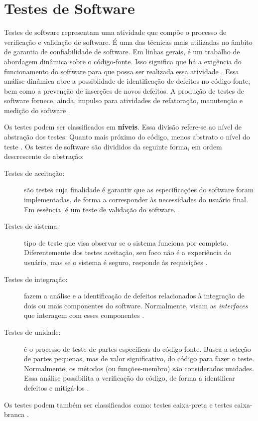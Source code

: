 \section{Testes de Software}
Testes de software representam uma atividade que compõe o processo de verificação e validação de software. É uma das técnicas mais utilizadas no âmbito de garantia de confiabilidade de software. Em linhas gerais, é um trabalho de abordagem dinâmica sobre o código-fonte. Isso significa que há a exigência do funcionamento do software para que possa ser realizada essa atividade \cite{barbosaEtAl2009}. Essa análise dinâmica abre a possiblidade de identificação de defeitos no código-fonte, bem como a prevenção de inserções de novos defeitos. A produção de testes de software fornece, ainda, impulso para atividades de refatoração, manutenção e medição do software \cite{barbosaEtAl2009}.
\par
\indent Os testes podem ser classificados em \textbf{níveis}. Essa divisão refere-se ao nível de abstração dos testes. Quanto mais próximo do código, menos abstrato o nível do teste \cite{sommerville2007}. Os testes de software são divididos da seguinte forma, em ordem descrescente de abstração:
\begin{description}
\item[Testes de aceitação:] são testes cuja finalidade é garantir que as especificações do software foram implementadas, de forma a corresponder às necessidades do usuário final. Em essência, é um teste de validação do software. \cite{sommerville2007}.
\item[Testes de sistema:] tipo de teste que visa observar se o sistema funciona por completo. Diferentemente dos testes aceitação, seu foco não é a experiência do usuário, mas se o sistema é seguro, responde às requisições \cite{sommerville2007}.
\item[Testes de integração:] fazem a análise e a identificação de defeitos relacionados à integração de dois ou mais componentes do software. Normalmente, visam as \textit{interfaces} que interagem com esses componentes \cite{sommerville2007}.
\item[Testes de unidade:] é o processo de teste de partes específicas do código-fonte. Busca a seleção de partes pequenas, mas de valor significativo, do código para fazer o teste. Normalmente, os métodos (ou funções-membro) são considerados unidades. Essa análise possibilita a verificação do código, de forma a identificar defeitos e mitigá-los \cite{sommerville2007}.
\end{description}
\par
\indent Os testes podem também ser classificados como: testes caixa-preta e testes caixa-branca \cite{barbosaEtAl2009}.


